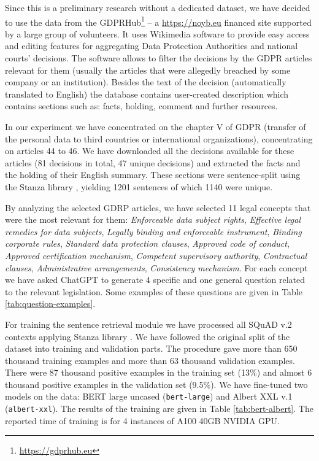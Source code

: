 Since this is a preliminary research without a dedicated dataset, we have decided to use
the data from the GDPRHub\footnote{\url{https://gdprhub.eu}} -- a \url{https://noyb.eu} financed site supported by
a large group of volunteers. It uses Wikimedia software to provide easy access and editing features for 
aggregating Data Protection Authorities and national courts' decisions. The software  allows to filter the 
decisions by the GDPR articles relevant for them (usually the articles that were allegedly breached by some 
company or an institution). Besides the text of the decision (automatically translated to English) the database
contains user-created description which contains sections such as: facts, holding, comment and further resources.

In our experiment we have concentrated on the chapter V of GDPR (transfer of the personal data to third countries or 
international organizations), concentrating on articles 44 to 46. We have downloaded all the decisions available for 
these articles (81 decisions in total, 47 unique decisions) and extracted the facts and the holding of their English 
summary. These sections were sentence-split using the Stanza library \cite{qi2020stanza}, yielding 1201 sentences
of which 1140 were unique. 

By analyzing the selected GDRP articles, we have selected 11 legal concepts that were the most relevant for them:
\textit{Enforceable data subject rights}, \textit{Effective legal remedies for data subjects}, 
\textit{Legally binding and enforceable instrument},
\textit{Binding corporate rules}, \textit{Standard data protection clauses}, \textit{Approved code of conduct},
\textit{Approved certification mechanism}, \textit{Competent supervisory authority}, \textit{Contractual clauses},
\textit{Administrative arrangements}, \textit{Consistency mechanism}. For each concept we have asked ChatGPT 
to generate 4 specific and one general question related to the relevant legislation. Some examples of these
questions are given in Table \ref{tab:question-examples}.

For training the sentence retrieval module we have processed all SQuAD v.2 \cite{rajpurkar2018know} contexts applying Stanza 
library \cite{qi2020stanza}. We have followed the original split of the dataset into training and validation parts.
The procedure gave more than 650 thousand training examples and more than 63 thousand validation examples. There were 87 thousand
positive examples in the training set (13\%) and almost 6 thousand positive examples in the validation set (9.5\%).
We have fine-tuned two models on the data: BERT large uncased \cite{devlin2018bert} (\texttt{bert-large}) and 
Albert XXL v.1 \cite{lan2019albert} (\texttt{albert-xxl}). The results of the training are given in Table \ref{tab:bert-albert}.
The reported time of training is for 4 instances of A100 40GB NVIDIA GPU.

